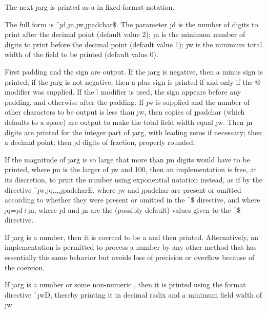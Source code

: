 \endsubsubsection%



The next \j{arg} is printed as a  in fixed-format notation.  

The full form is \f{~\j{d},\j{n},\j{w},\j{padchar}\$}.
The parameter \j{d} is the number
of digits to print after the decimal point (default value 2);
\j{n} is the minimum number of digits to print before the decimal
point (default value 1);
\j{w} is the minimum total width of the field to be printed (default
value 0).

First padding and the sign are output.
If the \j{arg} is negative, then a minus sign is printed;
if the \j{arg} is not negative, then a plus sign is printed
if and only if the \f{@} modifier was supplied.  
If the \f{:} modifier is used, the sign appears before any padding,
and otherwise after the padding.
If \j{w} is supplied and the number of other characters to be output
is less than \j{w}, then copies of \j{padchar} (which defaults
to a space) are output to
make the total field width equal \j{w}.
Then \j{n} digits are printed for the integer part of \j{arg},
with leading zeros if necessary; then a decimal point;
then \j{d} digits of fraction, properly rounded.

If the magnitude of \j{arg} is so large that more than \j{m} digits would
have to be printed, where \j{m} is the larger of \j{w} and 100, then an
implementation is free, at its discretion, to print the number using
exponential notation instead, as if by the directive
\f{~\j{w},\j{q},,,,\j{padchar}E}, where \j{w} and \j{padchar} are
present or omitted according to whether they were present or omitted in
the \f{~\$} directive, and where \j{q}=\j{d}+\j{n},
where \j{d} and \j{n} are the (possibly default) values given to the
\f{~\$} directive.

If \j{arg} is a  
number, then it is coerced to be a 
and then printed.  Alternatively, an implementation is permitted to
process a  number by any 
other method that has essentially the
same behavior but avoids loss of precision or overflow
because of the coercion.

If \j{arg} is a  number or some non-numeric
,
then it is printed using the format directive \f{~\j{w}D},
thereby printing it in decimal radix and a minimum field width of \j{w}.


